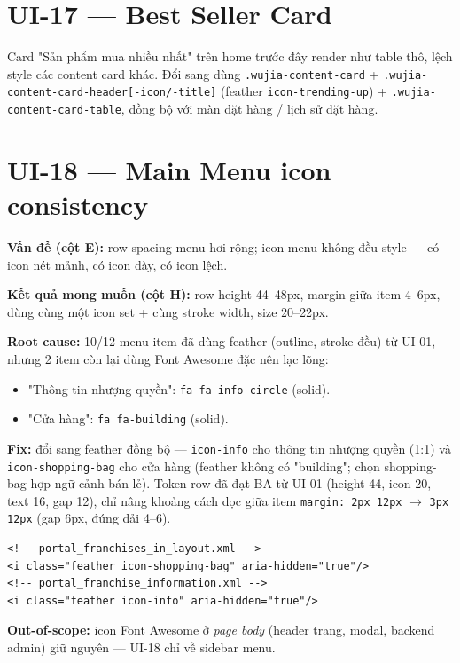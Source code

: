 \section{UI-17 --- Best Seller Card}

Card "Sản phẩm mua nhiều nhất" trên home trước đây render như table thô, lệch
style các content card khác. Đổi sang dùng \texttt{.wujia-content-card} +
\texttt{.wujia-content-card-header[-icon/-title]} (feather \texttt{icon-trending-up})
+ \texttt{.wujia-content-card-table}, đồng bộ với màn đặt hàng / lịch sử đặt hàng.

\section{UI-18 --- Main Menu icon consistency}

\textbf{Vấn đề (cột E):} row spacing menu hơi rộng; icon menu không đều style ---
có icon nét mảnh, có icon dày, có icon lệch.

\textbf{Kết quả mong muốn (cột H):} row height 44--48px, margin giữa item 4--6px,
dùng cùng một icon set + cùng stroke width, size 20--22px.

\textbf{Root cause:} 10/12 menu item đã dùng feather (outline, stroke đều) từ
UI-01, nhưng 2 item còn lại dùng Font Awesome đặc nên lạc lõng:

\begin{itemize}[leftmargin=*]
    \item "Thông tin nhượng quyền": \texttt{fa fa-info-circle} (solid).
    \item "Cửa hàng": \texttt{fa fa-building} (solid).
\end{itemize}

\textbf{Fix:} đổi sang feather đồng bộ --- \texttt{icon-info} cho thông tin nhượng
quyền (1:1) và \texttt{icon-shopping-bag} cho cửa hàng (feather không có
"building"; chọn shopping-bag hợp ngữ cảnh bán lẻ). Token row đã đạt BA từ UI-01
(height 44, icon 20, text 16, gap 12), chỉ nâng khoảng cách dọc giữa item
\texttt{margin: 2px 12px} \(\rightarrow\) \texttt{3px 12px} (gap 6px, đúng dải 4--6).

\begin{lstlisting}[style=xml]
<!-- portal_franchises_in_layout.xml -->
<i class="feather icon-shopping-bag" aria-hidden="true"/>
<!-- portal_franchise_information.xml -->
<i class="feather icon-info" aria-hidden="true"/>
\end{lstlisting}

\textbf{Out-of-scope:} icon Font Awesome ở \emph{page body} (header trang, modal,
backend admin) giữ nguyên --- UI-18 chỉ về sidebar menu.

